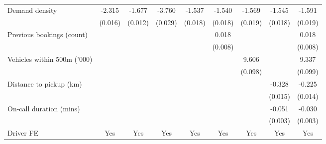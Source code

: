 \documentclass[reviewmode]{AEA}
\begin{document}
\begin{landscape}
\begin{table}
{\begin{tabular}{l*{8}{S}}
				\addlinespace
				Demand density      &      -2.315&      -1.677&      -3.760&      -1.537&      -1.540&      -1.569&      -1.545&      -1.591\\
				                    &     (0.016)         &     (0.012)         &     (0.029)         &     (0.018)         &     (0.018)         &     (0.019)         &     (0.018)         &     (0.019)         \\
				\addlinespace
				Previous bookings (count)&                     &                     &                     &                     &       0.018 &                     &                     &       0.018 \\
				                    &                     &                     &                     &                     &     (0.008)         &                     &                     &     (0.008)         \\
				\addlinespace
				Vehicles within 500m ('000)&                     &                     &                     &                     &                     &       9.606&                     &       9.337\\
				                    &                     &                     &                     &                     &                     &     (0.098)         &                     &     (0.099)         \\
				\addlinespace
				Distance to pickup (km)&                     &                     &                     &                     &                     &                     &      -0.328&      -0.225\\
				                    &                     &                     &                     &                     &                     &                     &     (0.015)         &     (0.014)         \\
				\addlinespace
				On-call duration (mins)&                     &                     &                     &                     &                     &                     &      -0.051&      -0.030\\
				                    &                     &                     &                     &                     &                     &                     &     (0.003)         &     (0.003)         \\
				\addlinespace
				Driver FE           &       {Yes}         &       {Yes}         &       {Yes}         &       {Yes}         &       {Yes}         &       {Yes}         &       {Yes}         &       {Yes}         \\

\end{tabular}}
\end{table}
\end{landscape}
\end{document}
